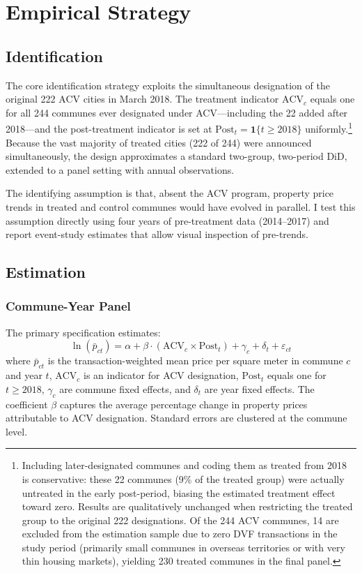 \documentclass[12pt]{article}
\begin{document}



\section{Empirical Strategy}

\subsection{Identification}

The core identification strategy exploits the simultaneous designation of the original 222 ACV cities in March 2018. The treatment indicator $\text{ACV}_c$ equals one for all 244 communes ever designated under ACV---including the 22 added after 2018---and the post-treatment indicator is set at $\text{Post}_t = \mathbf{1}\{t \geq 2018\}$ uniformly.\footnote{Including later-designated communes and coding them as treated from 2018 is conservative: these 22 communes (9\% of the treated group) were actually untreated in the early post-period, biasing the estimated treatment effect toward zero. Results are qualitatively unchanged when restricting the treated group to the original 222 designations. Of the 244 ACV communes, 14 are excluded from the estimation sample due to zero DVF transactions in the study period (primarily small communes in overseas territories or with very thin housing markets), yielding 230 treated communes in the final panel.} Because the vast majority of treated cities (222 of 244) were announced simultaneously, the design approximates a standard two-group, two-period DiD, extended to a panel setting with annual observations.

The identifying assumption is that, absent the ACV program, property price trends in treated and control communes would have evolved in parallel. I test this assumption directly using four years of pre-treatment data (2014--2017) and report event-study estimates that allow visual inspection of pre-trends.

\subsection{Estimation}

\subsubsection{Commune-Year Panel}

The primary specification estimates:
\begin{equation}
\ln(\bar{p}_{ct}) = \alpha + \beta \cdot (\text{ACV}_c \times \text{Post}_t) + \gamma_c + \delta_t + \varepsilon_{ct}
\label{eq:main}
\end{equation}
where $\bar{p}_{ct}$ is the transaction-weighted mean price per square meter in commune $c$ and year $t$, $\text{ACV}_c$ is an indicator for ACV designation, $\text{Post}_t$ equals one for $t \geq 2018$, $\gamma_c$ are commune fixed effects, and $\delta_t$ are year fixed effects. The coefficient $\beta$ captures the average percentage change in property prices attributable to ACV designation. Standard errors are clustered at the commune level.
\end{document}
